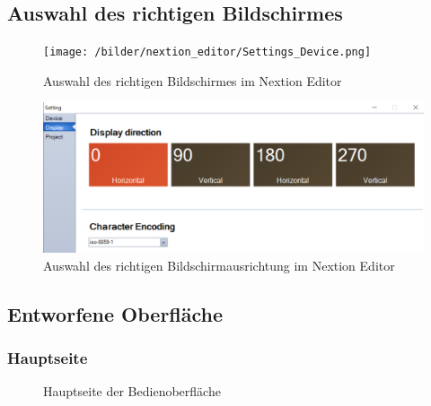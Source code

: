 \newpage
\subsection{Auswahl des richtigen Bildschirmes}
\begin{figure}[h]
    \centering
    \texttt{[image: /bilder/nextion\_editor/Settings\_Device.png]}
    \caption{Auswahl des richtigen Bildschirmes im Nextion Editor}
\end{figure}

\begin{figure}[h]
    \centering
    \includegraphics[width=\textwidth]{bilder/nextion_editor/Settings_Display.png}
    \caption{Auswahl des richtigen Bildschirmausrichtung im Nextion Editor}
\end{figure}

\newpage
\subsection{Entworfene Oberfläche}
\subsubsection{Hauptseite}
\begin{figure}[h]
    \centering
    \caption{Hauptseite der Bedienoberfläche}
\end{figure}
\newpage

